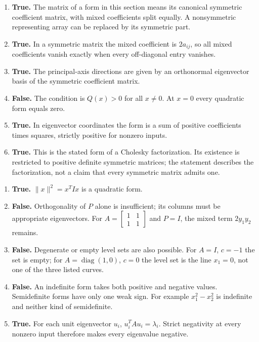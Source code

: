 \begin{enumerate}[label=(\alph*)]
\item \textbf{True.} The matrix of a form in this section means its
canonical symmetric coefficient matrix, with mixed coefficients split equally.
A nonsymmetric representing array can be replaced by its symmetric part.
\item \textbf{True.} In a symmetric matrix the mixed coefficient is
$2a_{ij}$, so all mixed coefficients vanish exactly when every off-diagonal
entry vanishes.
\item \textbf{True.} The principal-axis directions are given by an
orthonormal eigenvector basis of the symmetric coefficient matrix.
\item \textbf{False.} The condition is $Q(x)>0$ for all $x\ne0$.
At $x=0$ every quadratic form equals zero.
\item \textbf{True.} In eigenvector coordinates the form is a sum
of positive coefficients times squares, strictly positive for nonzero inputs.
\item \textbf{True.} This is the stated form of a Cholesky factorization.
Its existence is restricted to positive definite symmetric matrices;
the statement describes the factorization, not a claim that every symmetric
matrix admits one.
\end{enumerate}

\begin{enumerate}[label=(\alph*)]
\item \textbf{True.} $\|x\|^2=x^TIx$ is a quadratic form.
\item \textbf{False.} Orthogonality of $P$ alone is insufficient;
its columns must be appropriate eigenvectors. For
$A=\begin{bmatrix}1&1\\1&1\end{bmatrix}$ and $P=I$, the mixed
term $2y_1y_2$ remains.
\item \textbf{False.} Degenerate or empty level sets are also possible.
For $A=I$, $c=-1$ the set is empty; for $A=\operatorname{diag}(1,0)$,
$c=0$ the level set is the line $x_1=0$, not one of the three listed curves.
\item \textbf{False.} An indefinite form takes both positive and
negative values. Semidefinite forms have only one weak sign. For example
$x_1^2-x_2^2$ is indefinite and neither kind of semidefinite.
\item \textbf{True.} For each unit eigenvector $u_i$,
$u_i^TAu_i=\lambda_i$. Strict negativity at every nonzero input therefore
makes every eigenvalue negative.
\end{enumerate}

